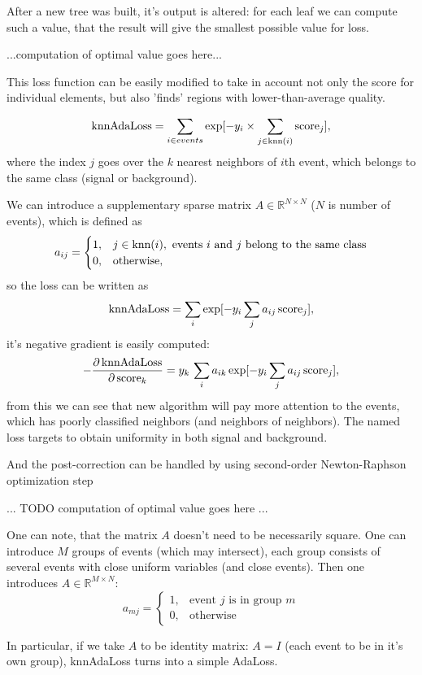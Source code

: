 \documentclass{JINST}
\theoremstyle{definition}
\theoremstyle{remark}
\def\RR{\mathbb{R}}
\begin{document}
After a new tree was built, it's output is altered: for each leaf we can compute such a value, that the result will give the smallest possible value for loss.

...computation of optimal value goes here...

This loss function can be easily modified to take in account not only the score for individual elements, but also 'finds' regions with lower-than-average quality.

\[
	\text{knnAdaLoss} = \sum_{i \in events} \exp[-y_i \times \sum_{j \in \text{knn}(i)} \text{score}_j],
\]
where the index $j$ goes over the $k$ nearest neighbors of $i$th event, which belongs to the same class (signal or background).

We can introduce a supplementary sparse matrix $A \in \RR^{N \times N}$ ($N$ is number of events), which is defined as 
\[
a_{ij} = \begin{cases} 
1, & j \in \text{knn}(i), \text{ events $i$ and $j$ belong to the same class} \\
0, & \text{otherwise},
\end{cases}
\] so the loss can be written as
\[
	\text{knnAdaLoss} = \sum_i \exp [- y_i \sum_j a_{ij} \, \text{score}_j ],
\]
it's negative gradient is easily computed:
\[
	-\dfrac{\partial \, \text{knnAdaLoss}} {\partial \, \text{score}_k} = 
	 y_k \, \sum_i a_{ik} \exp [- y_i \sum_j a_{ij} \, \text{score}_j ],
\]
from this we can see that new algorithm will pay more attention to the events, which has poorly classified neighbors (and neighbors of neighbors). The named loss targets to obtain uniformity in both signal and background.

And the post-correction can be handled by using second-order Newton-Raphson optimization step 

... TODO computation of optimal value goes here ...

One can note, that the matrix $A$ doesn't need to be necessarily square. One can introduce $M$ groups of events (which may intersect), each group consists of several events with close uniform variables (and close events). Then one introduces $A \in \RR^{M \times N}$:
\[
	a_{mj} = \begin{cases}
		1, & \text{event $j$ is in group $m$} \\
		0, & \text{otherwise}
	\end{cases}
\]

In particular, if we take $A$ to be identity matrix: $A = I$ (each event to be in it's own group), knnAdaLoss turns into a simple AdaLoss.
\end{document}
